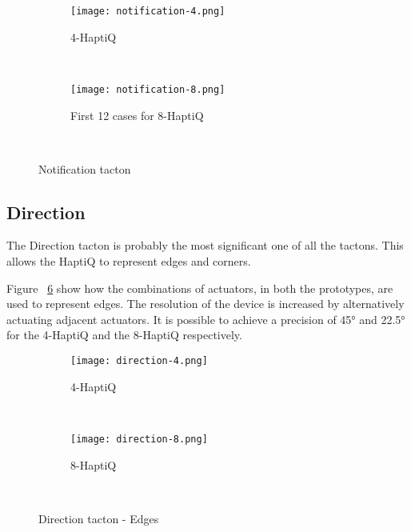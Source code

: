 \begin{figure}[H]
        \centering
        \begin{subfigure}[H]{0.7\textwidth}
                \texttt{[image: notification-4.png]}
                \caption{4-HaptiQ}
                \label{fig:notification-4}
        \end{subfigure}%
        ~ %
          
        \begin{subfigure}[H]{0.7\textwidth}
                \texttt{[image: notification-8.png]}
                \caption{First 12 cases for 8-HaptiQ}
                \label{fig:notification-8}
        \end{subfigure}
        ~ %
        \caption{Notification tacton}\label{fig:notification}
\end{figure}

\subsection{Direction}

The Direction tacton  is probably the most significant one of all the tactons. This allows the HaptiQ to represent edges and corners. 

Figure ~\ref{fig:edges} show how the combinations of actuators, in both the prototypes, are used to represent edges. The resolution of the device is increased by alternatively actuating adjacent actuators. It is possible to achieve a precision of 45° and 22.5° for the 4-HaptiQ and the 8-HaptiQ respectively. 

\begin{figure}[H]
        \centering
        \begin{subfigure}[H]{0.3\textwidth}
                \texttt{[image: direction-4.png]}
                \caption{4-HaptiQ}
                \label{fig:direction-4}
        \end{subfigure}%
        ~ %
        \begin{subfigure}[H]{0.5\textwidth}
                \texttt{[image: direction-8.png]}
                \caption{8-HaptiQ}
                \label{fig:direction-8}
        \end{subfigure}
        ~ %
        \caption{Direction tacton - Edges}\label{fig:edges}
\end{figure}

